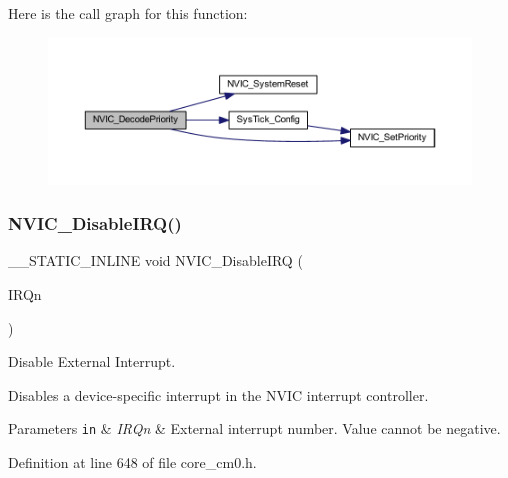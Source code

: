 Here is the call graph for this function\+:
\nopagebreak
\begin{figure}[H]
\begin{center}
\leavevmode
\includegraphics[width=350pt]{group___c_m_s_i_s___core___n_v_i_c_functions_ga3387607fd8a1a32cccd77d2ac672dd96_cgraph}
\end{center}
\end{figure}
\mbox{\label{group___c_m_s_i_s___core___n_v_i_c_functions_ga260fba04ac8346855c57f091d4ee1e71}} 
\subsubsection{\texorpdfstring{N\+V\+I\+C\+\_\+\+Disable\+I\+R\+Q()}{NVIC\_DisableIRQ()}}
{\footnotesize\ttfamily \+\_\+\+\_\+\+S\+T\+A\+T\+I\+C\+\_\+\+I\+N\+L\+I\+NE void N\+V\+I\+C\+\_\+\+Disable\+I\+RQ (\begin{DoxyParamCaption}\item[{\hyperlink{group___configuration__section__for___c_m_s_i_s_gac3af4a32370fb28c4ade8bf2add80251}{I\+R\+Qn\+\_\+\+Type}}]{I\+R\+Qn }\end{DoxyParamCaption})}



Disable External Interrupt. 

Disables a device-\/specific interrupt in the N\+V\+IC interrupt controller. 
\begin{DoxyParams}[1]{Parameters}
\mbox{\tt in}  & {\em I\+R\+Qn} & External interrupt number. Value cannot be negative. \\
\hline
\end{DoxyParams}


Definition at line 648 of file core\+\_\+cm0.\+h.

